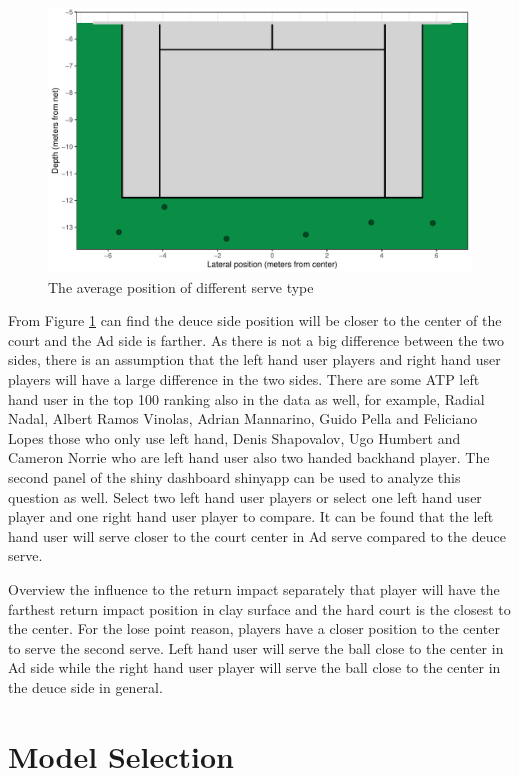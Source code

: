 \documentclass[11pt,a4paper,]{article}
\begin{document}
\begin{figure}
\centering
\includegraphics{pdf_files/figure-latex/sertype-1.pdf}
\caption{\label{fig:sertype}The average position of different serve type}
\end{figure}

From Figure \ref{fig:sertype} can find the deuce side position will be closer to the center of the court and the Ad side is farther. As there is not a big difference between the two sides, there is an assumption that the left hand user players and right hand user players will have a large difference in the two sides. There are some ATP left hand user in the top 100 ranking also in the data as well, for example, Radial Nadal, Albert Ramos Vinolas, Adrian Mannarino, Guido Pella and Feliciano Lopes those who only use left hand, Denis Shapovalov, Ugo Humbert and Cameron Norrie who are left hand user also two handed backhand player. The second panel of the shiny dashboard shinyapp can be used to analyze this question as well. Select two left hand user players or select one left hand user player and one right hand user player to compare. It can be found that the left hand user will serve closer to the court center in Ad serve compared to the deuce serve.

Overview the influence to the return impact separately that player will have the farthest return impact position in clay surface and the hard court is the closest to the center. For the lose point reason, players have a closer position to the center to serve the second serve. Left hand user will serve the ball close to the center in Ad side while the right hand user player will serve the ball close to the center in the deuce side in general.

\hypertarget{model-selection}{%
\section{Model Selection}\label{model-selection}}
\end{document}
